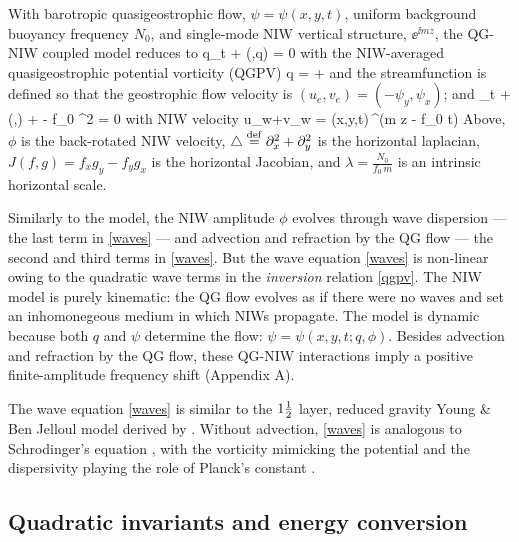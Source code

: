 \documentclass{jfm}
\begin{document}
With barotropic quasigeostrophic flow, $\psi=\psi(x,y,t)$,
uniform background buoyancy frequency $N_0$, and
single-mode NIW vertical structure, $\ee^{\ii m z}$, the \cite{xie_vanneste2015}
QG-NIW coupled model reduces to
\beq
\label{macroturb}
q_t + \sJ(\psi,q) = 0\com
\eeq
with the NIW-averaged quasigeostrophic potential vorticity (QGPV)
\beq
\label{qgpv}
q = \lap \psi +
                 \com
\eeq
and the streamfunction is defined so that the geostrophic flow velocity is
$(u_e, v_e) = (-\psi_y, \psi_x)$; and
\beq
\label{waves}
\phi_t + \sJ(\psi,\phi) + \phi\lap \psi -  f_0 \lambda^2 \lap \phi
 = 0\com
\eeq
with NIW velocity
\beq
\label{niw_velocity}
u_w+\ii v_w  = \phi(x,y,t)\,\ee^{\ii (m z - f_0 t)}\per
\eeq
Above,
$\phi$ is the back-rotated NIW
velocity, $\triangle \stackrel{\mathrm{def}}{=} \partial_x^2 + \partial_y^2$ is the horizontal laplacian,
$J(f,g)=f_x g_y - f_y g_x$ is the horizontal Jacobian, and
$\lambda = \tfrac{N_0}{f_0\, m}$  is an intrinsic horizontal scale.

Similarly to the \cite{young_benjelloul1997} model, the NIW amplitude $\phi$
evolves through wave dispersion --- the last term in \eqref{waves} --- and
advection and refraction by the QG flow --- the second and third terms in
\eqref{waves}. But the wave equation \eqref{waves} is non-linear owing to the
quadratic wave terms in the \textit{inversion} relation \eqref{qgpv}. The
\cite{young_benjelloul1997} NIW model is purely kinematic: the QG flow evolves as
if there were no waves and set an inhomonegeous medium in which NIWs propagate.
The \cite{xie_vanneste2015} model is dynamic because both $q$ and $\psi$
determine the flow: $\psi=\psi(x,y,t; q, \phi)$. Besides advection and refraction
by the QG flow, these QG-NIW interactions imply a positive finite-amplitude
frequency shift (Appendix A).

The wave equation \eqref{waves} is similar to the $1\tfrac{1}{2}$ layer, reduced gravity
Young \& Ben Jelloul model derived by  \cite{danioux_etal2015}. Without advection,
\eqref{waves} is analogous to Schrodinger's equation
\citep[e.g.,][ pg. 51]{landau_lifshitz2013}, with the vorticity mimicking the
potential and the dispersivity playing the role of Planck's constant
\citep{danioux_etal2015}.

\subsection{Quadratic invariants and energy conversion}
\end{document}
